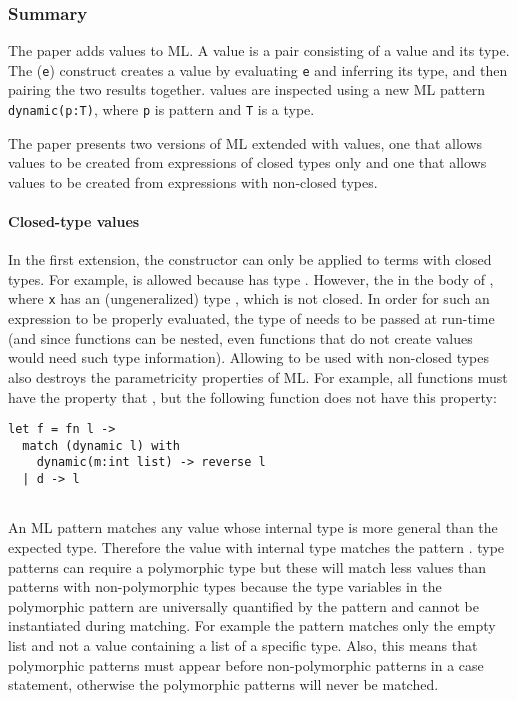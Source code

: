 \documentclass[12pt]{article}	%
\begin{document}
\subsubsection*{Summary}
The paper adds \Dynamic values to ML. A \Dynamic value is a pair consisting of a value and its type. The (\dynamic \texttt{e}) construct creates a \Dynamic value by evaluating \texttt{e} and inferring its type, and then pairing the two results together. \Dynamic values are inspected using a new ML pattern \texttt{dynamic(p:T)}, where \texttt{p} is pattern and \texttt{T} is a type.

The paper presents two versions of ML extended with \Dynamic values, one that allows \Dynamic values to be created from expressions of closed types only and one that allows \Dynamic values to be created from expressions with non-closed types.

\paragraph{Closed-type \Dynamic values}
In the first extension, the \dynamic constructor can only be applied to terms with closed types. For example,  is allowed because  has type . However, the \dynamic in the body of , where \texttt{x} has an (ungeneralized) type \mlcode{\alpha}, which is not closed. In order for such an expression to be properly evaluated, the type of \mlcode{\alpha} needs to be passed at run-time (and since functions can be nested, even functions that do not create \Dynamic values would need such type information). Allowing \dynamic to be used with non-closed types also destroys the parametricity properties of ML. For example, all functions  must have the property that , but the following function does not have this property:

\begin{verbatim}
let f = fn l ->
  match (dynamic l) with
    dynamic(m:int list) -> reverse l 
  | d -> l
    
\end{verbatim}

An ML \dynamic pattern matches any \Dynamic value whose internal type is more general than the expected type. Therefore the value \dynamic {} with internal type  matches the pattern . \dynamic type patterns can require a polymorphic type but these will match less \Dynamic values than patterns with non-polymorphic types because the type variables in the polymorphic pattern are universally quantified by the pattern and cannot be instantiated during matching. For example the pattern  matches only the empty list and not a \Dynamic value containing a list of a specific type. Also, this means that polymorphic \dynamic patterns must appear before non-polymorphic \dynamic patterns in a case statement, otherwise the polymorphic patterns will never be matched.
\end{document}

